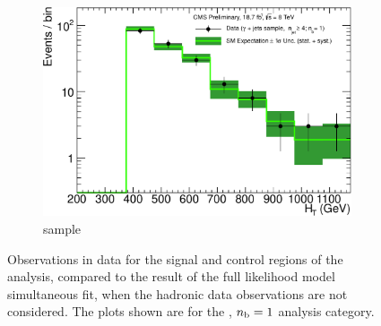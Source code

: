 \begin{figure}[h!]
\begin{subfigure}[b]{0.48\textwidth}
    \includegraphics[width=\textwidth]
    {Figs/results/v0/greenBand/single_plots/photon_1b_ge4j_logy.pdf}
    \caption{\gj sample}
  \end{subfigure}
  \caption{Observations in data for the signal and control
  regions of the analysis, compared to the result of the full likelihood model
  simultaneous fit, when the hadronic data observations are not considered. The
  plots shown are for the \njhigh, $n_{\text{b}} = 1$ analysis category.}
  \label{fig:green_fits_1b_ge4j}
\end{figure}

